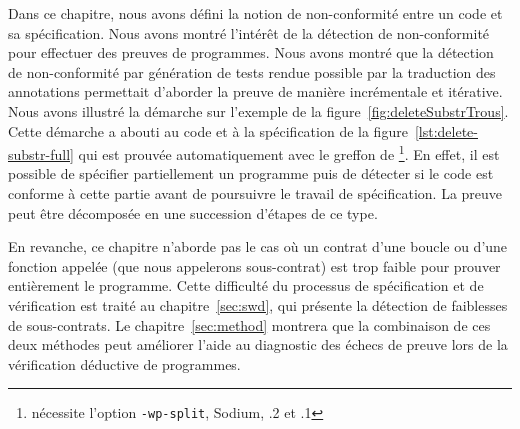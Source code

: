 Dans ce chapitre, nous avons défini la notion de non-conformité entre un code
et sa spécification.
Nous avons montré l'intérêt de la détection de non-conformité pour effectuer
des preuves de programmes.
Nous avons montré que la détection de non-conformité par génération de tests
rendue possible par la traduction des annotations permettait d'aborder la preuve
de manière incrémentale et itérative.
Nous avons illustré la démarche sur l'exemple de la
figure~\ref{fig:deleteSubstrTrous}.
Cette démarche a abouti au code et à la spécification de la
figure~\ref{lst:delete-substr-full}
qui est prouvée automatiquement avec le greffon \Wp de \framac
\footnote{nécessite l'option \texttt{-wp-split}, \framac Sodium, .2
  et .1}.
En effet, il est possible de spécifier partiellement un programme puis de
détecter si le code est conforme à cette partie avant de poursuivre le travail
de spécification.
La preuve peut être décomposée en une succession d'étapes de ce type.

En revanche, ce chapitre n'aborde pas le cas où un contrat d'une boucle ou
d'une fonction appelée (que nous appelerons sous-contrat) est trop faible pour
prouver entièrement le programme.
Cette difficulté du processus de spécification et de vérification est traité au
chapitre~\ref{sec:swd}, qui présente la détection de faiblesses de
sous-contrats.
Le chapitre~\ref{sec:method} montrera que la combinaison de ces deux méthodes
peut améliorer l'aide au diagnostic des échecs de preuve lors de la vérification
déductive de programmes.
